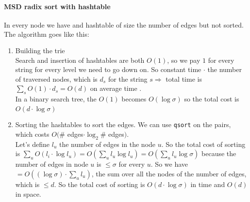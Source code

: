 \documentclass[10pt]{report}
\begin{document}
\paragraph{MSD radix sort with hashtable} In every node we have and hashtable of size the number of edges but not sorted. The algorithm goes like this:
\begin{enumerate}
	\item Building the trie\\
	Search and insertion of hashtables are both $O(1)$, so we pay $1$ for every string for every level we need to go down on. So constant time $\cdot$ the number of traversed nodes, which is $d_s$ for the string $s\Rightarrow$ total time is $\sum_s O(1)\cdot d_s = O(d)$ on average time .\\
	In a binary search tree, the $O(1)$ becomes $O(\log\sigma)$ so the total cost is $O(d\cdot\log\sigma)$
	\item Sorting the hashtables to sort the edges. We can use \texttt{qsort} on the pairs, which costs $O(\#$ edges$\cdot\log_2\#$ edges$)$.\\
	Let's define $l_u$ the number of edges in the node $u$. So the total cost of sorting is $\sum_u O(l_i\cdot\log l_u)=O\left(\sum_u l_u\log l_u \right) = O\left(\sum_u l_u\log\sigma \right)$ because the number of edges in node $u$ is $\leq \sigma$ for every $u$. So we have $= O\left((\log\sigma)\cdot\sum_u l_u \right)$, the sum over all the nodes of the number of edges, which is $\leq d$. So the total cost of sorting is $O(d\cdot\log\sigma)$ in time and $O(d)$ in space.
\end{enumerate}
\end{document}
